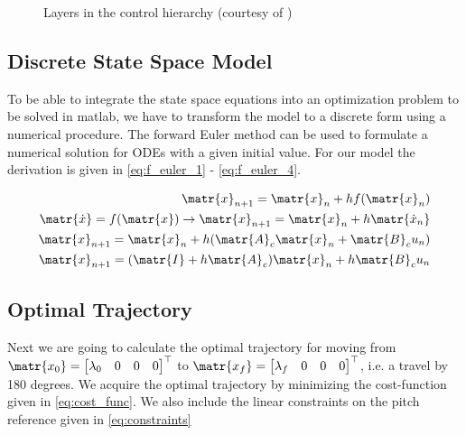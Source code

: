 \begin{figure}[ht]
	\centering
	
	\caption{Layers in the control hierarchy (courtesy of \cite{Assignment-text})}
\label{fig:layers_openloop}
\end{figure}

\subsection{Discrete State Space Model}

To be able to integrate the state space equations into an optimization problem to be solved in matlab, we have to transform the model to a discrete form using a numerical procedure. The forward Euler method can be used to formulate a numerical solution for ODEs with a given initial value. For our model the derivation is given in \cref{eq:f_euler_1} - \cref{eq:f_euler_4}.

\begin{subequations}\label{eq:f_euler}
    \begin{align}
        \matr{x}_{n+1} = \matr{x}_n + hf(\matr{x}_n) \label{eq:f_euler_1} \\
        \matr{\dot{x}} = f(\matr{x}) \rightarrow \matr{x}_{n+1} = \matr{x}_n + h\matr{\dot{x}_n} \label{eq:f_euler_2} \\
        \matr{x}_{n+1} = \matr{x}_n + h(\matr{A}_c\matr{x}_n + \matr{B}_cu_{n}) \label{eq:f_euler_3} \\
        \matr{x}_{n+1} = (\matr{I} + h\matr{A}_c)\matr{x}_n + h\matr{B}_cu_n \label{eq:f_euler_4}
    \end{align}
\end{subequations}

\subsection{Optimal Trajectory}

Next we are going to calculate the optimal trajectory for moving from $\matr{x_{0}} = \begin{bmatrix} \lambda_{0} & 0 & 0 & 0 \end{bmatrix}^\top$ to $\matr{x_{f}} = \begin{bmatrix} \lambda_{f} & 0 & 0 & 0 \end{bmatrix}^\top$, i.e. a travel by 180 degrees. We acquire the optimal trajectory by minimizing the cost-function given in \cref{eq:cost_func}. We also include the linear constraints on the pitch reference given in \cref{eq:constraints}

